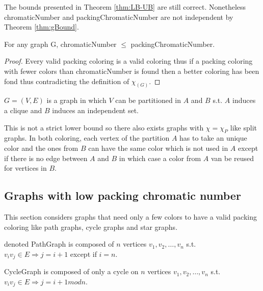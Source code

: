 The bounds presented in Theorem \ref{thm:LB-UB} are still correct. Nonetheless \gls{chromaticNumber} and \gls{packingChromaticNumber} are not independent by Theorem \ref{thm:gBound}.


\begin{thm}
\label{thm:gBound}
For any graph G, \gls{chromaticNumber} $\leq $ \gls{packingChromaticNumber}.
\end{thm}

\begin{proof}
Every valid packing coloring is a valid coloring thus if a packing coloring with fewer colors than \gls{chromaticNumber} is found then a better coloring has been fond thus contradicting the definition of $\chi_(G)$.
\end{proof}

\begin{mydef}
\label{def:splitGraph}
 $G=(V,E)$ is a graph in which $V$ can be partitioned in $A$ and $B$ s.t. $A$ induces a clique and $B$ induces an independent set.
\end{mydef}

This is not a strict lower bound so there also exists graphs with $\chi = \chi_P$ like split graphs. In both coloring, each vertex of the partition $A$ has to take an unique color and the ones from $B$ can have the same color which is not used in $A$ except if there is no edge between $A$ and $B$ in which case a color from $A$ van be reused for vertices in $B$.



\subsection{Graphs with low packing chromatic number}

This section considers graphs that need only a few colors to have a valid packing coloring like path graphs, cycle graphs and star graphs.

\begin{mydef}
 denoted \gls{PathGraph} is composed of $n$ vertices $v_1,v_2,\dots,v_n$ s.t. $v_iv_j \in E \Rightarrow j = i+1$ except if $i=n$.
\end{mydef}

\begin{mydef}
\label{def:cycleGraph}
 \gls{CycleGraph} is composed of only a cycle on $n$ vertices $v_1,v_2,\dots,v_n$ s.t. $v_iv_j \in E \Rightarrow j = i+1 mod n$.
\end{mydef}

